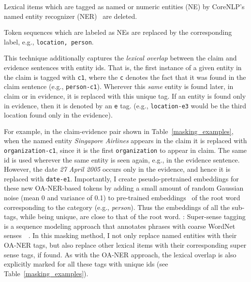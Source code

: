 \documentclass[compsoc,onecolumn]{IEEEtran}
\begin{document}
{}
Lexical items which are tagged as named or numeric entities (NE) by CoreNLP's named entity recognizer (NER)~\citep*{manning2014stanford} are deleted.  

{}  Token sequences which are labeled as NEs are replaced by the corresponding label, e.g., \texttt{location, person}.

{} This technique additionally captures the \textit{lexical overlap} between the claim and evidence sentences with entity ids.  
That is, the first instance of a given entity in the claim is tagged with \texttt{c1}, where the \texttt{c} denotes the fact that it was found in the claim sentence (e.g., \texttt{person-c1}). Wherever this {\em same} entity is found later, in claim or in evidence, it is replaced with this unique tag. If an entity is found only in evidence, then it is denoted by an \texttt{e} tag. (e.g., \texttt{location-e3} would be the third location found only in the evidence).

For example, in the claim-evidence pair shown in Table~\ref{masking_examples}, when the named entity \textit{Singapore Airlines} appears in the claim it is replaced with \texttt{organization-c1}, since it is the first \texttt{organization} to appear in claim. 
The same id is used wherever the same entity is seen again, e.g., in the evidence sentence. However, the date \textit{27 April 2005} occurs only in the evidence, and hence it is replaced with \texttt{date-e1}.
Importantly, I create pseudo-pretrained embeddings for these new OA-NER-based tokens by adding a small amount of random Gaussian noise (mean 0 and variance of 0.1) to pre-trained embeddings~\citep*{pennington2014glove} of the root word corresponding to the category (e.g., \textit{person}). Thus the embeddings of all the sub-tags, while being unique, are close to that of the root word.
{}:
Super-sense tagging is a sequence modeling approach that annotates phrases with coarse WordNet senses~\citep*{ciaramita2003supersense}~\citep*{miller1990introduction}. In this masking method, I not only replace named entities with their OA-NER tags, but also replace other lexical items with their corresponding super sense tags, if found. As with the OA-NER approach, the lexical overlap is also explicitly marked for all these tags with unique ids (see Table~\ref{masking_examples}). 
\end{document}
